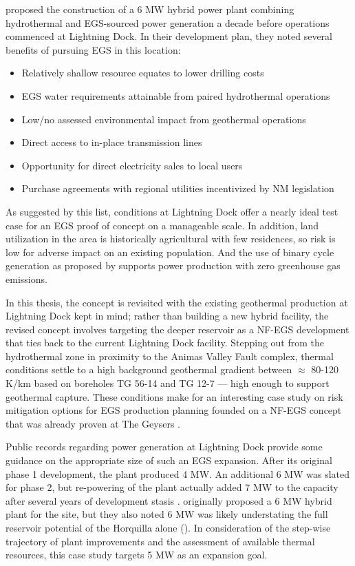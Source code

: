 \citet{schochet_development_2001} proposed the construction of a 6 MW hybrid power plant combining hydrothermal and EGS-sourced power generation a decade before operations commenced at Lightning Dock. In their development plan, they noted several benefits of pursuing EGS in this location:
\begin{itemize}[itemsep=2pt]\label{ch4:ld_egs_support}
    \item Relatively shallow resource equates to lower drilling costs
    \item EGS water requirements attainable from paired hydrothermal operations
    \item Low/no assessed environmental impact from geothermal operations
    \item Direct access to in-place transmission lines  
    \item Opportunity for direct electricity sales to local users
    \item Purchase agreements with regional utilities incentivized by NM legislation
\end{itemize}

As suggested by this list, conditions at Lightning Dock offer a nearly ideal test case for an EGS proof of concept on a manageable scale. In addition, land utilization in the area is historically agricultural with few residences, so risk is low for adverse impact on an existing population. And the use of binary cycle generation as proposed by \citet{schochet_development_2001} supports power production with zero greenhouse gas emissions.  

In this thesis, the \citeauthor{schochet_development_2001} concept is revisited with the existing geothermal production at Lightning Dock kept in mind; rather than building a new hybrid facility, the revised concept involves targeting the deeper reservoir as a NF-EGS development that ties back to the current Lightning Dock facility. Stepping out from the hydrothermal zone in proximity to the Animas Valley Fault complex, thermal conditions settle to a high background geothermal gradient between $\approx$ 80-120 K/km based on boreholes TG 56-14 and TG 12-7 \citep{cunniff_final_2003} --- high enough to support geothermal capture. These conditions make for an interesting case study on risk mitigation options for EGS production planning founded on a NF-EGS concept that was already proven at The Geysers \citep{pan_establishment_2019}.

Public records regarding power generation at Lightning Dock provide some guidance on the appropriate size of such an EGS expansion. After its original phase 1 development, the plant produced 4 MW. An additional 6 MW was slated for phase 2, but re-powering of the plant actually added 7 MW to the capacity after several years of development stasis \citep{think_geoenergy_turboden_2020}. \citeauthor{schochet_development_2001} originally proposed a 6 MW hybrid plant for the site, but they also noted 6 MW was likely understating the full reservoir potential of the Horquilla alone (\citeyear{schochet_development_2001}). In consideration of the step-wise trajectory of plant improvements and the assessment of available thermal resources, this case study targets 5 MW as an expansion goal. 

